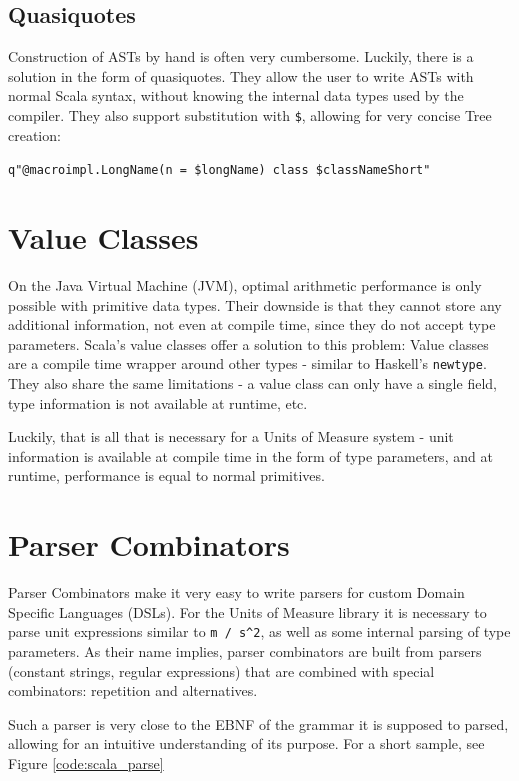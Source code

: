 \documentclass[12pt,oneside,a4paper]{scrbook}
\begin{document}
\subsection{Quasiquotes}
Construction of ASTs by hand is often very cumbersome. Luckily, there is a solution in the form of quasiquotes. They allow the user to write ASTs with normal Scala syntax, without knowing the internal data types used by the compiler. They also support substitution with \verb|$|, allowing for very concise Tree creation:

\verb|q"@macroimpl.LongName(n = $longName) class $classNameShort"|



\section{Value Classes}
\label{sec:value_classes}

On the Java Virtual Machine (JVM), optimal arithmetic performance is only possible with primitive data types. Their downside is that they cannot store any additional information, not even at compile time, since they do not accept type parameters.
Scala's value classes offer a solution to this problem: Value classes are a compile time wrapper around other types - similar to Haskell's \verb|newtype|. They also share the same limitations - a value class can only have a single field, type information is not available at runtime, etc.

Luckily, that is all that is necessary for a Units of Measure system - unit information is available at compile time in the form of type parameters, and at runtime, performance is equal to normal primitives.


\section{Parser Combinators}

Parser Combinators make it very easy to write parsers for custom Domain Specific Languages (DSLs). For the Units of Measure library it is necessary to parse unit expressions similar to \verb|m / s^2|, as well as some internal parsing of type parameters. As their name implies, parser combinators are built from parsers (constant strings, regular expressions) that are combined with special combinators: repetition and alternatives. \citep{Spiewak09}

Such a parser is very close to the EBNF of the grammar it is supposed to parsed, allowing for an intuitive understanding of its purpose. For a short sample, see Figure \ref{code:scala_parse}
\end{document}
